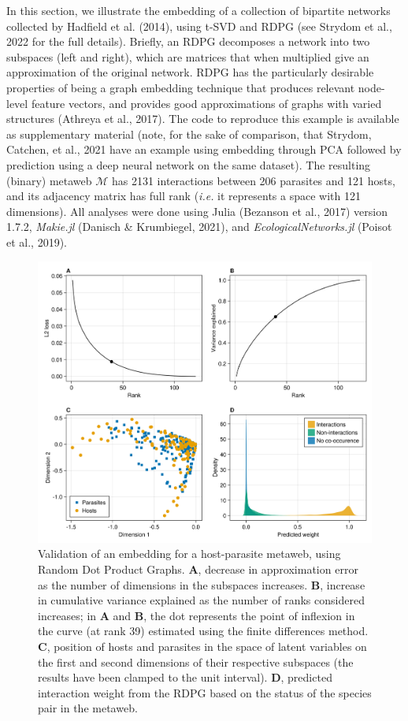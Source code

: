 \documentclass[10pt,oneside]{article}
\makeatletter
\def\maxwidth{\ifdim\Gin@nat@width>\linewidth\linewidth
\else\Gin@nat@width\fi}
\let\Oldincludegraphics\includegraphics
\renewcommand{\includegraphics}[1]{\Oldincludegraphics[width=\maxwidth]{#1}}
\makeatother
\begin{document}
In this section, we illustrate the embedding of a collection of
bipartite networks collected by Hadfield et al. (2014), using t-SVD and
RDPG (see Strydom et al., 2022 for the full details). Briefly, an RDPG
decomposes a network into two subspaces (left and right), which are
matrices that when multiplied give an approximation of the original
network. RDPG has the particularly desirable properties of being a graph
embedding technique that produces relevant node-level feature vectors,
and provides good approximations of graphs with varied structures
(Athreya et al., 2017). The code to reproduce this example is available
as supplementary material (note, for the sake of comparison, that
Strydom, Catchen, et al., 2021 have an example using embedding through
PCA followed by prediction using a deep neural network on the same
dataset). The resulting (binary) metaweb \(\mathcal{M}\) has 2131
interactions between 206 parasites and 121 hosts, and its adjacency
matrix has full rank (\emph{i.e.} it represents a space with 121
dimensions). All analyses were done using Julia (Bezanson et al., 2017)
version 1.7.2, \emph{Makie.jl} (Danisch \& Krumbiegel, 2021), and
\emph{EcologicalNetworks.jl} (Poisot et al., 2019).

\begin{figure}
\hypertarget{fig:illustration1}{%
\centering
\includegraphics{figures/illustration-part1.png}
\caption{Validation of an embedding for a host-parasite metaweb, using
Random Dot Product Graphs. \textbf{A}, decrease in approximation error
as the number of dimensions in the subspaces increases. \textbf{B},
increase in cumulative variance explained as the number of ranks
considered increases; in \textbf{A} and \textbf{B}, the dot represents
the point of inflexion in the curve (at rank 39) estimated using the
finite differences method. \textbf{C}, position of hosts and parasites
in the space of latent variables on the first and second dimensions of
their respective subspaces (the results have been clamped to the unit
interval). \textbf{D}, predicted interaction weight from the RDPG based
on the status of the species pair in the
metaweb.}\label{fig:illustration1}
}
\end{figure}
\end{document}
